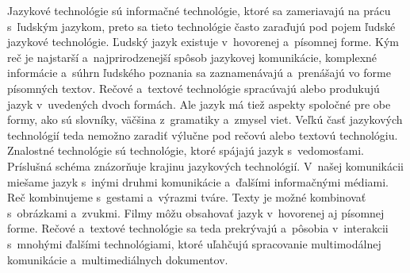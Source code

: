 Jazykové technológie sú informačné technológie, ktoré sa zameriavajú na prácu s~ľudským jazykom, preto sa tieto technológie často zaraďujú pod pojem ľudské jazykové technológie. Ľudský jazyk existuje v~hovorenej a~písomnej forme. Kým reč je najstarší a~najprirodzenejší spôsob jazykovej komunikácie, komplexné informácie a~súhrn ľudského poznania sa zaznamenávajú a~prenášajú vo forme písomných textov. Rečové a~textové technológie spracúvajú alebo produkujú jazyk v~uvedených dvoch formách. Ale jazyk má tiež aspekty spoločné pre obe formy, ako sú slovníky, väčšina z~gramatiky a~zmysel viet. Veľkú časť jazykových technológií teda nemožno zaradiť výlučne pod rečovú alebo textovú technológiu. Znalostné technológie sú technológie, ktoré spájajú jazyk s~vedomosťami. Príslušná schéma znázorňuje krajinu jazykových technológií. V~našej komunikácii miešame jazyk s~inými druhmi komunikácie a~ďalšími informačnými médiami. Reč kombinujeme s~gestami a~výrazmi tváre. Texty je možné kombinovať s~obrázkami a~zvukmi. Filmy môžu obsahovať jazyk v~hovorenej aj písomnej forme. Rečové a~textové technológie sa teda prekrývajú a~pôsobia v~interakcii s~mnohými ďalšími technológiami, ktoré uľahčujú spracovanie multimodálnej komunikácie a~multimediálnych dokumentov.

